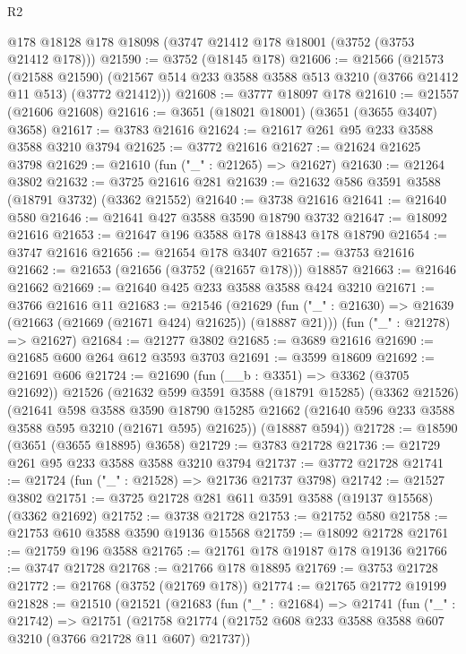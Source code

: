 \begin{lexlean}{R2}
\begin{coremodule}
    @178
    @18128
    @178
    @18098
    (@3747 @21412 @178 @18001 (@3752 (@3753 @21412 @178)))
@21590 := @3752 (@18145 @178)
@21606 := @21566
    (@21573
      (@21588 @21590)
      (@21567 @514 @233 @3588 @3588 @513 @3210 (@3766 @21412 @11 @513) (@3772 @21412)))
@21608 := @3777 @18097 @178
@21610 := @21557 (@21606 @21608)
@21616 := @3651 (@18021 @18001) (@3651 (@3655 @3407) @3658)
@21617 := @3783 @21616
@21624 := @21617 @261 @95 @233 @3588 @3588 @3210 @3794
@21625 := @3772 @21616
@21627 := @21624 @21625 @3798
@21629 := @21610 (fun ("_" : @21265) => @21627)
@21630 := @21264 @3802
@21632 := @3725 @21616 @281
@21639 := @21632 @586 @3591 @3588 (@18791 @3732) (@3362 @21552)
@21640 := @3738 @21616
@21641 := @21640 @580
@21646 := @21641 @427 @3588 @3590 @18790 @3732
@21647 := @18092 @21616
@21653 := @21647 @196 @3588 @178 @18843 @178 @18790
@21654 := @3747 @21616
@21656 := @21654 @178 @3407
@21657 := @3753 @21616
@21662 := @21653 (@21656 (@3752 (@21657 @178))) @18857
@21663 := @21646 @21662
@21669 := @21640 @425 @233 @3588 @3588 @424 @3210
@21671 := @3766 @21616 @11
@21683 := @21546
    (@21629 (fun ("_" : @21630) => @21639 (@21663 (@21669 (@21671 @424) @21625)) (@18887 @21)))
    (fun ("_" : @21278) => @21627)
@21684 := @21277 @3802
@21685 := @3689 @21616
@21690 := @21685 @600 @264 @612 @3593 @3703
@21691 := @3599 @18609
@21692 := @21691 @606
@21724 := @21690
    (fun (__b : @3351) => @3362 (@3705 @21692))
    @21526
    (@21632
      @599
      @3591
      @3588
      (@18791 @15285)
      (@3362 @21526)
      (@21641
        @598
        @3588
        @3590
        @18790
        @15285
        @21662
        (@21640 @596 @233 @3588 @3588 @595 @3210 (@21671 @595) @21625))
      (@18887 @594))
@21728 := @18590 (@3651 (@3655 @18895) @3658)
@21729 := @3783 @21728
@21736 := @21729 @261 @95 @233 @3588 @3588 @3210 @3794
@21737 := @3772 @21728
@21741 := @21724 (fun ("_" : @21528) => @21736 @21737 @3798)
@21742 := @21527 @3802
@21751 := @3725 @21728 @281 @611 @3591 @3588 (@19137 @15568) (@3362 @21692)
@21752 := @3738 @21728
@21753 := @21752 @580
@21758 := @21753 @610 @3588 @3590 @19136 @15568
@21759 := @18092 @21728
@21761 := @21759 @196 @3588
@21765 := @21761 @178 @19187 @178 @19136
@21766 := @3747 @21728
@21768 := @21766 @178 @18895
@21769 := @3753 @21728
@21772 := @21768 (@3752 (@21769 @178))
@21774 := @21765 @21772 @19199
@21828 := @21510
    (@21521
      (@21683
        (fun ("_" : @21684) =>
        @21741
          (fun ("_" : @21742) =>
          @21751
            (@21758 @21774 (@21752 @608 @233 @3588 @3588 @607 @3210 (@3766 @21728 @11 @607) @21737))

\end{coremodule}
\end{lexlean}
